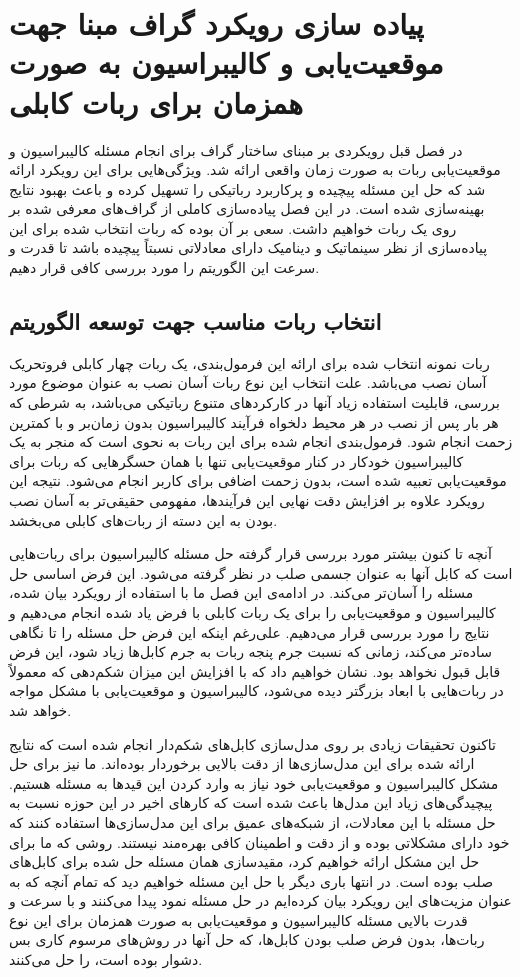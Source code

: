 \chapter{پیاده سازی رویکرد گراف مبنا جهت موقعیت‌یابی و کالیبراسیون به صورت همزمان برای ربات کابلی}

در فصل قبل رویکردی بر مبنای ساختار گراف برای انجام مسئله کالیبراسیون و موقعیت‌یابی ربات به صورت زمان واقعی ارائه شد. ویژگی‌هایی برای این رویکرد ارائه شد که حل این مسئله پیچیده و پرکاربرد رباتیکی را تسهیل کرده و باعث بهبود نتایج بهینه‌سازی شده است. در این فصل پیاده‌سازی کاملی از گراف‌های معرفی شده بر روی یک ربات خواهیم داشت. سعی بر آن بوده که ربات انتخاب شده برای این پیاده‌سازی از نظر سینماتیک و دینامیک دارای معادلاتی نسبتاً پیچیده باشد تا قدرت و سرعت این الگوریتم را مورد بررسی کافی قرار دهیم.


\section{انتخاب ربات مناسب جهت توسعه الگوریتم}

ربات نمونه انتخاب شده برای ارائه این فرمول‌بندی، یک ربات چهار کابلی فروتحریک آسان نصب می‌باشد. علت انتخاب این نوع ربات آسان نصب به عنوان موضوع مورد بررسی، قابلیت استفاده زیاد آنها در کارکردهای متنوع رباتیکی می‌باشد، به شرطی که هر بار پس از نصب در هر محیط دلخواه فرآیند کالیبراسیون بدون زمان‌بر و با کمترین زحمت انجام شود. فرمول‌بندی انجام شده برای این ربات به نحوی است که منجر به یک کالیبراسیون خودکار در کنار موقعیت‌یابی تنها با همان حسگرهایی که ربات برای موقعیت‌یابی تعبیه شده است، بدون زحمت اضافی برای کاربر انجام می‌شود. نتیجه این رویکرد علاوه بر افزایش دقت نهایی این فرآیندها، مفهومی حقیقی‌تر به آسان نصب بودن به این دسته از ربات‌های کابلی می‌بخشد.

آنچه تا کنون بیشتر مورد بررسی قرار گرفته حل مسئله کالیبراسیون برای ربات‌هایی است که کابل آنها به عنوان جسمی صلب در نظر گرفته می‌شود. این فرض اساسی حل مسئله را آسان‌تر می‌کند. در ادامه‌ی این فصل ما با استفاده از رویکرد بیان شده، کالیبراسیون و موقعیت‌یابی را برای یک ربات کابلی با فرض یاد شده انجام می‌دهیم و نتایج را مورد بررسی قرار می‌دهیم. علی‌رغم اینکه این فرض حل مسئله را تا نگاهی ساده‌تر می‌کند، زمانی که نسبت جرم پنجه ربات به جرم کابل‌ها زیاد شود، این فرض قابل قبول نخواهد بود. نشان خواهیم داد که با افزایش این میزان شکم‌دهی که معمولاً در ربات‌هایی با ابعاد بزرگتر دیده می‌شود، کالیبراسیون و موقعیت‌یابی با مشکل مواجه خواهد شد.

تاکنون تحقیقات زیادی بر روی مدل‌سازی کابل‌های شکم‌دار انجام شده است که نتایج ارائه شده برای این مدل‌سازی‌ها از دقت بالایی برخوردار بوده‌اند. ما نیز برای حل مشکل کالیبراسیون و موقعیت‌یابی خود نیاز به وارد کردن این قیدها به مسئله هستیم. پیچیدگی‌های زیاد این مدل‌ها باعث شده است که کارهای اخیر در این حوزه نسبت به حل مسئله با این معادلات، از شبکه‌های عمیق برای این مدل‌سازی‌ها استفاده کنند که خود دارای مشکلاتی بوده و از دقت و اطمینان کافی بهره‌مند نیستند. روشی که ما برای حل این مشکل ارائه خواهیم کرد، مقیدسازی همان مسئله حل شده برای کابل‌های صلب بوده است. در انتها باری دیگر با حل این مسئله خواهیم دید که تمام آنچه که به عنوان مزیت‌های این رویکرد بیان کرده‌ایم در حل مسئله نمود پیدا می‌کنند و با سرعت و قدرت بالایی مسئله کالیبراسیون و موقعیت‌یابی به صورت همزمان برای این نوع ربات‌ها، بدون فرض صلب بودن کابل‌ها، که حل آنها در روش‌های مرسوم کاری بس دشوار بوده است، را حل می‌کنند.

